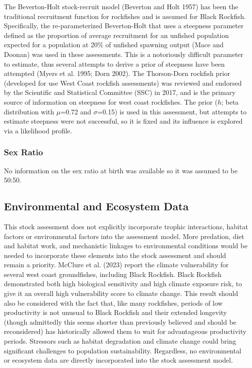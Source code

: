 \documentclass[11pt,
  letterpaper,
]{article}
\begin{document}
The Beverton-Holt stock-recruit model (Beverton and Holt 1957) has been the traditional recruitment function for rockfishes and is assumed for Black Rockfish. Specifically, the re-parameterized Beverton-Holt that uses a steepness parameter defined as the proportion of average recruitment for an unfished population expected for a population at 20\% of unfished spawning output (Mace and Doonan) was used in these assessments. This is a notoriously difficult parameter to estimate, thus several attempts to derive a prior of steepness have been attempted (Myers et al. 1995; Dorn 2002). The Thorson-Dorn rockfish prior (developed for use West Coast rockfish assessments) was reviewed and endorsed by the Scientific and Statistical Committee (SSC) in 2017, and is the primary source of information on steepness for west coast rockfishes. The prior (\(h\); beta distribution with \(\mu\)=0.72 and \(\sigma\)=0.15) is used in this assessment, but attempts to estimate steepness were not successful, so it is fixed and its influence is explored via a likelihood profile.

\hypertarget{sex-ratio}{%
\subsubsection{Sex Ratio}\label{sex-ratio}}

No information on the sex ratio at birth was available so it was assumed to be 50:50.

\hypertarget{environmental-and-ecosystem-data}{%
\subsection{Environmental and Ecosystem Data}\label{environmental-and-ecosystem-data}}

This stock assessment does not explicitly incorporate trophic interactions, habitat factors or environmental factors into the assessment model. More predation, diet and habitat work, and mechanistic linkages to environmental conditions would be needed to incorporate these elements into the stock assessment and should remain a priority. McClure et al. (2023) report the climate vulnerability for several west coast groundfishes, including Black Rockfish. Black Rockfish demonstrated both high biological sensitivity and high climate exposure risk, to give it an overall high vulnerability score to climate change. This result should also be considered with the fact that, like many rockfishes, periods of low productivity is not unusual to Black Rockfish and their extended longevity (though admittedly this seems shorter than previously believed and should be reconsidered) has historically allowed them to wait for advantageous productivity periods. Stressors such as habitat degradation and climate change could bring significant challenges to population sustainability. Regardless, no environmental or ecosystem data are directly incorporated into the stock assessment model.
\end{document}
